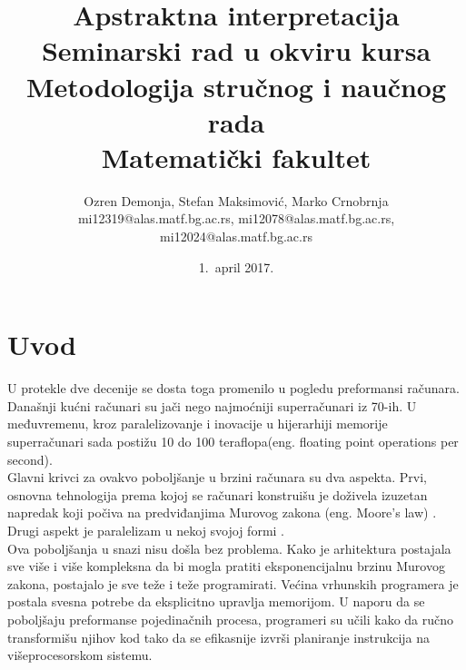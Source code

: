 \documentclass[a4paper]{article}
\begin{document}
\title{Apstraktna interpretacija\\ \small{Seminarski rad u okviru kursa\\Metodologija stručnog i naučnog rada\\ Matematički fakultet}}

\author{Ozren Demonja, Stefan Maksimović, Marko Crnobrnja\\ mi12319@alas.matf.bg.ac.rs, mi12078@alas.matf.bg.ac.rs, mi12024@alas.matf.bg.ac.rs}
\date{1.~april 2017.}
\maketitle


\tableofcontents

\newpage

\section{Uvod}
\label{sec:uvod}
U protekle dve decenije se dosta toga promenilo u pogledu preformansi računara. Današnji kućni računari su jači nego najmoćniji superračunari iz 70-ih. U međuvremenu, kroz paralelizovanje i inovacije u hijerarhiji memorije superračunari sada postižu 10 do 100 teraflopa(eng. floating point operations per second). \cite{allen2001optimizing} \\

Glavni krivci za ovakvo poboljšanje u brzini računara su dva aspekta. Prvi, osnovna tehnologija prema kojoj se računari konstruišu je doživela izuzetan napredak koji počiva na predviđanjima Murovog zakona (eng. Moore's law) \cite{Schaller1997MooresLaw}. Drugi aspekt je paralelizam u nekoj svojoj formi \cite{allen2001optimizing}.  \\

Ova poboljšanja u snazi nisu došla bez problema. Kako je arhitektura postajala sve više i više kompleksna da bi mogla pratiti eksponencijalnu brzinu Murovog zakona, postajalo je sve teže i teže programirati. Većina vrhunskih programera je postala svesna potrebe da eksplicitno upravlja memorijom. U naporu da se poboljšaju preformanse pojedinačnih procesa, programeri su učili kako da ručno transformišu njihov kod tako da se efikasnije izvrši planiranje instrukcija na višeprocesorskom sistemu. \cite{allen2001optimizing} \\
\end{document}
